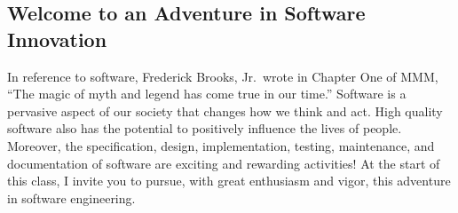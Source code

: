 \documentclass[11pt]{article}
\begin{document}
\subsection*{Welcome to an Adventure in Software Innovation}

In reference to software, Frederick Brooks, Jr.\ wrote in Chapter One of MMM,
``The magic of myth and legend has come true in our time.'' Software is a
pervasive aspect of our society that changes how we think and act. High quality
software also has the potential to positively influence the lives of people.
Moreover, the specification, design, implementation, testing, maintenance, and
documentation of software are exciting and rewarding activities! At the start of
this class, I invite you to pursue, with great enthusiasm and vigor, this
adventure in software engineering.
\end{document}
